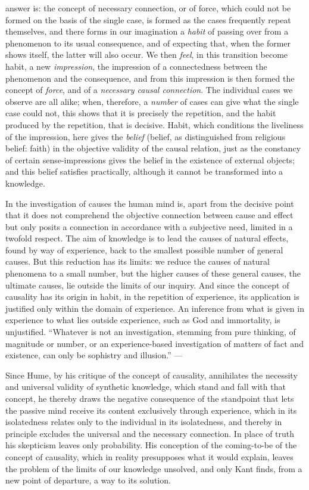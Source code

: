 answer is: the concept of necessary connection, or of force, which
could not be formed on the basis of the single case, is formed as
the cases frequently repeat themselves, and there forms in our
imagination a \emph{habit} of passing over from a phenomenon to its
usual consequence, and of expecting that, when the former shows itself,
the latter will also occur. We then \emph{feel}, in this transition
become habit, a new \emph{impression}, the impression of a connectedness
between the phenomenon and the consequence, and from this impression is
then formed the concept of \emph{force}, and of a \emph{necessary causal
connection}. The individual cases we observe are all alike; when,
therefore, a \emph{number} of cases can give what the single case could
not, this shows that it is precisely the repetition, and the habit
produced by the repetition, that is decisive. Habit, which conditions
the liveliness of the impression, here gives the \emph{belief} (belief,
as distinguished from religious belief: faith) in the objective
validity of the causal relation, just as the constancy of certain
sense-impressions gives the belief in the existence of external
objects; and this belief satisfies practically, although it cannot be
transformed into a knowledge.

In the investigation of causes the human mind is, apart from the
decisive point that it does not comprehend the objective connection
between cause and effect but only posits a connection in accordance
with a subjective need, limited in a twofold respect. The aim of
knowledge is to lead the causes of natural effects, found by way of
experience, back to the smallest possible number of general causes. But
this reduction has its limits: we reduce the causes of natural
phenomena to a small number, but the higher causes of these general
causes, the ultimate causes, lie outside the limits of our inquiry. And
since the concept of causality has its origin in habit, in the
repetition of experience, its application is justified only within the
domain of experience. An inference from what is given in experience to
what lies outside experience, such as God and immortality, is
unjustified. ``Whatever is not an investigation, stemming from pure
thinking, of magnitude or number, or an experience-based
investigation of matters of fact and existence, can only be
sophistry and illusion.'' ---

Since Hume, by his critique of the concept of causality, annihilates
the necessity and universal validity of synthetic knowledge, which
stand and fall with that concept, he thereby draws the negative
consequence of the standpoint that lets the passive mind receive its
content exclusively through experience, which in its isolatedness
relates only to the individual in its isolatedness, and thereby in
principle excludes the universal and the necessary connection. In place
of truth his skepticism leaves only probability. His conception of the
coming-to-be of the concept of causality, which in reality presupposes
what it would explain, leaves the problem of the limits of our
knowledge unsolved, and only Kant finds, from a new point of departure,
a way to its solution.

